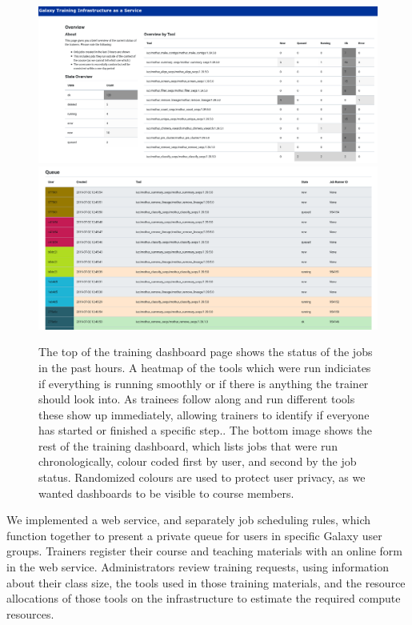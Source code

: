 \documentclass[a4paper,num-refs]{oup-contemporary}
\begin{document}
\begin{figure}[bt!]
\centering
\includegraphics[width=\linewidth]{images/dashboard.png}
\includegraphics[width=\linewidth]{images/queue.png}
\caption{The top of the training dashboard page shows the status of the jobs in the past hours. A heatmap of the tools which were run indiciates if everything is running smoothly or if there is anything the trainer should look into. As trainees follow along and run different tools these show up immediately, allowing trainers to identify if everyone has started or finished a specific step.. The bottom image shows the rest of the training dashboard, which lists jobs that were run chronologically, colour coded first by user, and second by the job status. Randomized colours are used to protect user privacy, as we wanted dashboards to be visible to course members.}\label{figure:dashboard}
\end{figure}

We implemented a web service, and separately job scheduling rules, which function together to present a private queue for users in specific Galaxy user groups. Trainers register their course and teaching materials with an online form in the web service. Administrators review training requests, using information about their class size, the tools used in those training materials, and the resource allocations of those tools on the infrastructure to estimate the required compute resources.
\end{document}
